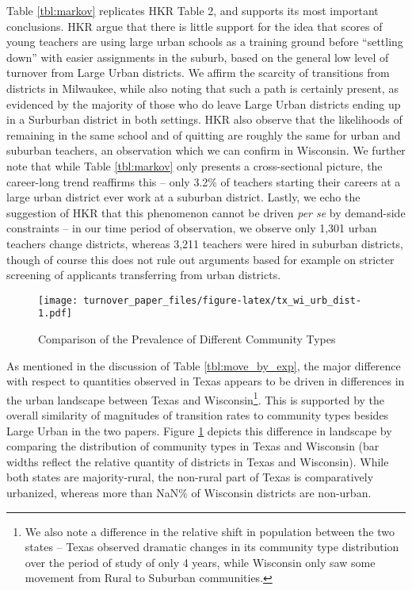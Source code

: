 \documentclass[12pt,]{article}
\let\rmarkdownfootnote\footnote%
\def\footnote{\protect\rmarkdownfootnote}
\begin{document}
Table \ref{tbl:markov} replicates HKR Table 2, and supports its most
important conclusions. HKR argue that there is little support for the
idea that scores of young teachers are using large urban schools as a
training ground before ``settling down'' with easier assignments in the
suburb, based on the general low level of turnover from Large Urban
districts. We affirm the scarcity of transitions from districts in
Milwaukee, while also noting that such a path is certainly present, as
evidenced by the majority of those who do leave Large Urban districts
ending up in a Surburban district in both settings. HKR also observe
that the likelihoods of remaining in the same school and of quitting are
roughly the same for urban and suburban teachers, an observation which
we can confirm in Wisconsin. We further note that while Table
\ref{tbl:markov} only presents a cross-sectional picture, the
career-long trend reaffirms this -- only 3.2\% of teachers starting
their careers at a large urban district ever work at a suburban
district. Lastly, we echo the suggestion of HKR that this phenomenon
cannot be driven \emph{per se} by demand-side constraints -- in our time
period of observation, we observe only 1,301 urban teachers change
districts, whereas 3,211 teachers were hired in suburban districts,
though of course this does not rule out arguments based for example on
stricter screening of applicants transferring from urban districts.

\begin{figure}[htbp]
\centering
\texttt{[image: turnover\_paper\_files/figure-latex/tx\_wi\_urb\_dist-1.pdf]}
\caption{\label{fig:ti_wi_urb}Comparison of the Prevalence of Different
Community Types}
\end{figure}

As mentioned in the discussion of Table \ref{tbl:move_by_exp}, the major
difference with respect to quantities observed in Texas appears to be
driven in differences in the urban landscape between Texas and
Wisconsin\footnote{We also note a difference in the relative shift in
  population between the two states -- Texas observed dramatic changes
  in its community type distribution over the period of study of only 4
  years, while Wisconsin only saw some movement from Rural to Suburban
  communities.}. This is supported by the overall similarity of
magnitudes of transition rates to community types besides Large Urban in
the two papers. Figure \ref{fig:ti_wi_urb} depicts this difference in
landscape by comparing the distribution of community types in Texas and
Wisconsin (bar widths reflect the relative quantity of districts in
Texas and Wisconsin). While both states are majority-rural, the
non-rural part of Texas is comparatively urbanized, whereas more than
NaN\% of Wisconsin districts are non-urban.
\end{document}
